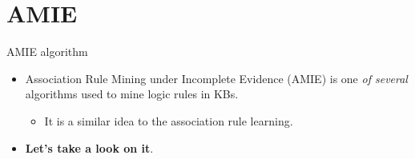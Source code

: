 \documentclass[xcolor={x11names}]{beamer}
\begin{document}


\section{AMIE}

\begin{frame}{AMIE algorithm}
	\begin{itemize}
   		\item Association Rule Mining under Incomplete Evidence (AMIE) is one 
            \textit{of several} algorithms used to mine logic rules in KBs.
	    \begin{itemize}
            \item It is a similar idea to the association rule learning.
        \end{itemize}
        \item \textbf{Let’s take a look on it}.
	\end{itemize}
\end{frame}
\end{document}
